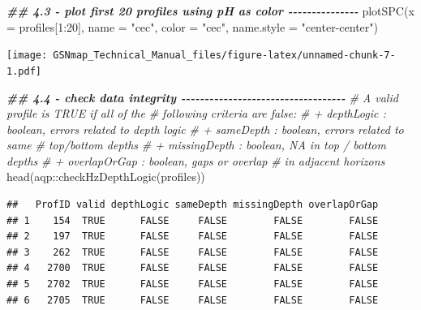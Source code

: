 \documentclass[
  10pt,
  b5paper,
  oneside]{book}
\newenvironment{Shaded}{\begin{snugshade}}{\end{snugshade}}
\newcommand{\AttributeTok}[1]{\textcolor[rgb]{0.77,0.63,0.00}{#1}}
\newcommand{\CommentTok}[1]{\textcolor[rgb]{0.56,0.35,0.01}{\textit{#1}}}
\newcommand{\DecValTok}[1]{\textcolor[rgb]{0.00,0.00,0.81}{#1}}
\newcommand{\DocumentationTok}[1]{\textcolor[rgb]{0.56,0.35,0.01}{\textbf{\textit{#1}}}}
\newcommand{\FunctionTok}[1]{\textcolor[rgb]{0.00,0.00,0.00}{#1}}
\newcommand{\NormalTok}[1]{#1}
\newcommand{\OtherTok}[1]{\textcolor[rgb]{0.56,0.35,0.01}{#1}}
\newcommand{\SpecialCharTok}[1]{\textcolor[rgb]{0.00,0.00,0.00}{#1}}
\newcommand{\StringTok}[1]{\textcolor[rgb]{0.31,0.60,0.02}{#1}}
\begin{document}
\begin{Shaded}
\begin{Highlighting}[]
\DocumentationTok{\#\# 4.3 {-} plot first 20 profiles using pH as color {-}{-}{-}{-}{-}{-}{-}{-}{-}{-}{-}{-}{-}{-}{-}}
\FunctionTok{plotSPC}\NormalTok{(}\AttributeTok{x =}\NormalTok{ profiles[}\DecValTok{1}\SpecialCharTok{:}\DecValTok{20}\NormalTok{], }\AttributeTok{name =} \StringTok{"cec"}\NormalTok{, }\AttributeTok{color =} \StringTok{"cec"}\NormalTok{,}
        \AttributeTok{name.style =} \StringTok{"center{-}center"}\NormalTok{)}
\end{Highlighting}
\end{Shaded}

\texttt{[image: GSNmap\_Technical\_Manual\_files/figure-latex/unnamed-chunk-7-1.pdf]}

\begin{Shaded}
\begin{Highlighting}[]
\DocumentationTok{\#\# 4.4 {-} check data integrity {-}{-}{-}{-}{-}{-}{-}{-}{-}{-}{-}{-}{-}{-}{-}{-}{-}{-}{-}{-}{-}{-}{-}{-}{-}{-}{-}{-}{-}{-}{-}{-}{-}{-}{-}}
\CommentTok{\# A valid profile is TRUE if all of the }
\CommentTok{\# following criteria are false:}
\CommentTok{\#    + depthLogic : boolean, errors related to depth logic}
\CommentTok{\#    + sameDepth : boolean, errors related to same }
\CommentTok{\#    top/bottom depths}
\CommentTok{\#    + missingDepth : boolean, NA in top / bottom depths}
\CommentTok{\#    + overlapOrGap : boolean, gaps or overlap }
\CommentTok{\#    in adjacent horizons}
\FunctionTok{head}\NormalTok{(aqp}\SpecialCharTok{::}\FunctionTok{checkHzDepthLogic}\NormalTok{(profiles))}
\end{Highlighting}
\end{Shaded}

\begin{verbatim}
##   ProfID valid depthLogic sameDepth missingDepth overlapOrGap
## 1    154  TRUE      FALSE     FALSE        FALSE        FALSE
## 2    197  TRUE      FALSE     FALSE        FALSE        FALSE
## 3    262  TRUE      FALSE     FALSE        FALSE        FALSE
## 4   2700  TRUE      FALSE     FALSE        FALSE        FALSE
## 5   2702  TRUE      FALSE     FALSE        FALSE        FALSE
## 6   2705  TRUE      FALSE     FALSE        FALSE        FALSE
\end{verbatim}

\begin{Shaded}
\end{Shaded}
\end{document}

